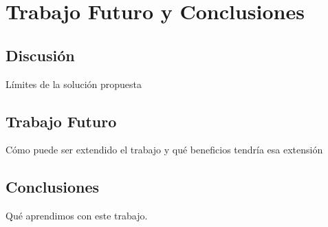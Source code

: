 \label{ch:trabajoFuturo}
\chapter{Trabajo Futuro y Conclusiones}
\section{Discusión}
Límites de la solución propuesta 

\section{Trabajo Futuro}
Cómo puede ser extendido el trabajo y qué beneficios tendría esa extensión 

\section{Conclusiones}
Qué aprendimos con este trabajo.\newline



